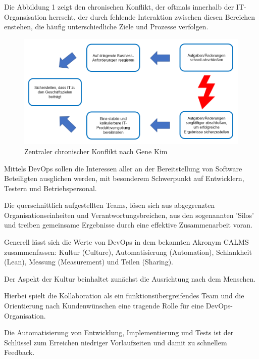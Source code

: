Die Abbildung 1 zeigt den chronischen Konflikt, der oftmals innerhalb der IT-Organsisation herrscht, der durch fehlende Interaktion zwischen diesen Bereichen enstehen, die häufig unterschiedliche Ziele und Prozesse verfolgen. \cite[S. 349 - 350]{kim_devops-handbuch_2017}

\begin{figure}[h]
    \centering
    \includegraphics[scale=0.6]{Bilder/Core Conflict Clouds}
    \caption{Zentraler chronischer Konflikt nach Gene Kim \cite[S. 349]{kim_devops-handbuch_2017}}
\end{figure}

Mittels DevOps sollen die Interessen aller an der Bereitstellung von Software Beteiligten ausglichen werden, mit besonderem Schwerpunkt auf Entwicklern, Testern und Betriebspersonal. \cite{humble_why_2011}

Die querschnittlich aufgestellten Teams, lösen sich aus abgegrenzten Organisationseinheiten und Verantwortungsbreichen, aus den sogenannten 'Silos' und treiben gemeinsame Ergebnisse durch eine effektive Zusammenarbeit voran. \cite[S.5]{halstenberg_devops_2020} \cite{sollner_devops_2017}

Generell lässt sich die Werte von DevOps in dem bekannten Akronym CALMS zusammenfassen: Kultur (Culture), Automatisierung (Automation), Schlankheit (Lean), Messung (Measurement) und Teilen (Sharing).  

Der Aspekt der Kultur beinhaltet zunächst die Ausrichtung nach dem Menschen.

Hierbei spielt die Kollaboration als ein funktionsübergreifendes Team und die Orientierung nach Kundenwünschen eine tragende Rolle für eine DevOps-Organisation. \cite[S.5]{halstenberg_devops_2020} 

Die Automatisierung von Entwicklung, Implementierung und Tests ist der Schlüssel zum Erreichen niedriger Vorlaufzeiten und damit zu schnellem Feedback. \cite{humble_why_2011}

